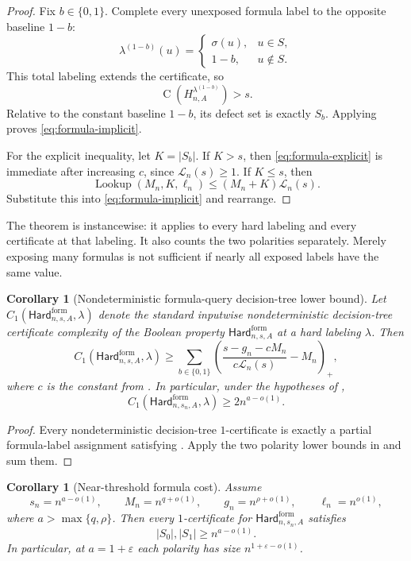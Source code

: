 \documentclass[11pt]{article}
\newtheorem{corollary}[theorem]{Corollary}
\theoremstyle{definition}
\newcommand{\bits}{\{0,1\}}
\newcommand{\Ckt}{\operatorname{C}}
\newcommand{\Lookup}{\operatorname{Lookup}}
\newcommand{\eps}{\varepsilon}
\newcommand{\HardF}{\mathsf{Hard}^{\mathrm{form}}}
\newcommand{\pospart}[1]{\left(#1\right)_{+}}
\begin{document}
\begin{proof}
Fix $b\in\bits$.  Complete every unexposed formula label to the opposite baseline $1-b$:
\[
  \lambda^{(1-b)}(u)=
  \begin{cases}
    \sigma(u),&u\in S,\\
    1-b,&u\notin S.
  \end{cases}
\]
This total labeling extends the certificate, so
\[
  \Ckt(H_{n,A}^{\lambda^{(1-b)}})>s.
\]
Relative to the constant baseline $1-b$, its defect set is exactly $S_b$.  Applying  proves \eqref{eq:formula-implicit}.

For the explicit inequality, let $K=|S_b|$.  If $K>s$, then \eqref{eq:formula-explicit} is immediate after increasing $c$, since $\mathcal L_n(s)\ge1$.  If $K\le s$, then
\[
  \Lookup(M_n,K,\ell_n)
  \le(M_n+K)\mathcal L_n(s).
\]
Substitute this into \eqref{eq:formula-implicit} and rearrange.
\end{proof}

The theorem is instancewise: it applies to every hard labeling and every certificate at that labeling.  It also counts the two polarities separately.  Merely exposing many formulas is not sufficient if nearly all exposed labels have the same value.

\begin{corollary}[Nondeterministic formula-query decision-tree lower bound]\label{cor:formula-ndt}
Let \(C_1(\HardF_{n,s,A},\lambda)\) denote the standard inputwise nondeterministic decision-tree certificate complexity of the Boolean property \(\HardF_{n,s,A}\) at a hard labeling \(\lambda\).  Then
\[
  C_1(\HardF_{n,s,A},\lambda)
  \ge
  \sum_{b\in\bits}
  \pospart{
    \frac{s-g_n-cM_n}{c\mathcal L_n(s)}-M_n
  },
\]
where \(c\) is the constant from .  In particular, under the hypotheses of ,
\[
  C_1(\HardF_{n,s_n,A},\lambda)\ge 2n^{a-o(1)}.
\]
\end{corollary}

\begin{proof}
Every nondeterministic decision-tree \(1\)-certificate is exactly a partial formula-label assignment satisfying .  Apply the two polarity lower bounds in  and sum them.
\end{proof}

\begin{corollary}[Near-threshold formula cost]\label{cor:formula-threshold}
Assume
\[
  s_n=n^{a-o(1)},\qquad
  M_n=n^{q+o(1)},\qquad
  g_n=n^{\rho+o(1)},\qquad
  \ell_n=n^{o(1)},
\]
where $a>\max\{q,\rho\}$.  Then every $1$-certificate for $\HardF_{n,s_n,A}$ satisfies
\[
  |S_0|,|S_1|\ge n^{a-o(1)}.
\]
In particular, at $a=1+\eps$ each polarity has size $n^{1+\eps-o(1)}$.
\end{corollary}
\end{document}
